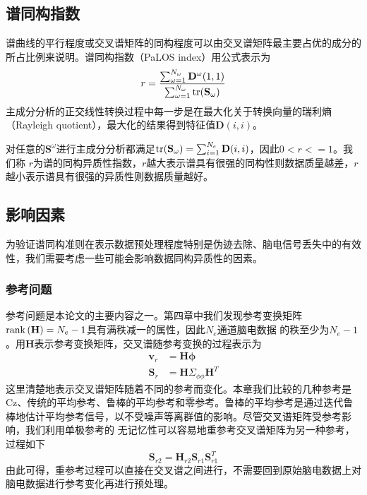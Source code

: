 \subsection{谱同构指数}
谱曲线的平行程度或交叉谱矩阵的同构程度可以由交叉谱矩阵最主要占优的成分的所占比例来说明。谱同构指数（PaLOS index）用公式表示为
\begin{equation}\label{eq5}
r=\frac{\sum_{\omega=1}^{N_\omega}\mathbf{D}^\omega(1,1)}{\sum_{\omega=1}^{N_\omega}\operatorname{tr}(\mathbf{S}_\omega)}
\end{equation}
主成分分析的正交线性转换过程中每一步是在最大化关于转换向量的瑞利熵（Rayleigh quotient），最大化的结果得到特征值$\mathbf{D}(i,i)$。

对任意的$\mathbf{S}^\omega$进行主成分分析都满足$\operatorname{tr}(\mathbf{S}_\omega)=\sum_{i=1}^{N_e}\mathbf{D}(i,i)$，因此$0<r<=1$。我们称
$r$为谱的同构异质性指数，$r$越大表示谱具有很强的同构性则数据质量越差，$r$越小表示谱具有很强的异质性则数据质量越好。

\subsection{影响因素}
为验证谱同构准则在表示数据预处理程度特别是伪迹去除、脑电信号丢失中的有效性，我们需要考虑一些可能会影响数据同构异质性的因素。
\subsubsection{参考问题}
参考问题是本论文的主要内容之一。第四章中我们发现参考变换矩阵$\operatorname{rank}{(\mathbf{H})}=N_e-1$具有满秩减一的属性，因此$N_e$通道脑电数据
的秩至少为$N_e-1$。用$\mathbf{H}$表示参考变换矩阵，交叉谱随参考变换的过程表示为
\begin{equation}\label{eq6}
\begin{aligned}
\mathbf{v}_r& =\mathbf{H\phi}\\
\mathbf{S}_r& =\mathbf{H}\Sigma_{\phi\phi}\mathbf{H}^T
\end{aligned}
\end{equation}
这里清楚地表示交叉谱矩阵随着不同的参考而变化。本章我们比较的几种参考是Cz、传统的平均参考、鲁棒的平均参考和零参考。鲁棒的平均参考是通过迭代鲁棒地估计平均参考信号，以不受噪声等离群值的影响。尽管交叉谱矩阵受参考影响，我们利用单极参考的
无记忆性可以容易地重参考交叉谱矩阵为另一种参考，过程如下
\begin{equation}\label{eq7}
\mathbf{S}_{r2}=\mathbf{H}_{r2}\mathbf{S}_{r1}\mathbf{S}_{r1}^T
\end{equation}
由此可得，重参考过程可以直接在交叉谱之间进行，不需要回到原始脑电数据上对脑电数据进行参考变化再进行预处理。

